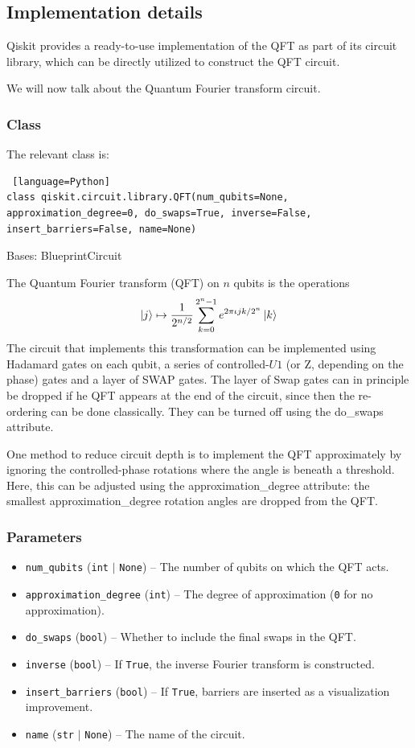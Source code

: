 \subsection{Implementation details}
Qiskit provides a ready-to-use implementation of the QFT as part of its circuit library, which can be directly utilized to construct the QFT circuit. 

We will now talk about the Quantum Fourier transform circuit.
\subsubsection{Class}
The relevant class is:
\begin{lstlisting} [language=Python]
class qiskit.circuit.library.QFT(num_qubits=None, approximation_degree=0, do_swaps=True, inverse=False, insert_barriers=False, name=None) 
\end{lstlisting}
Bases: BlueprintCircuit

The Quantum Fourier transform (QFT) on $n$ qubits is the operations
\[
\ket{j}\mapsto \frac{1}{2^{n/2}}\sum_{k=0}^{2^n-1}e^{2\pi\iota jk/2^n}\ket{k}
\]
The circuit that implements this transformation can be implemented using Hadamard gates on each qubit, a series of controlled-$U1$ (or Z, depending on the phase) gates and a layer of SWAP gates. The layer of Swap gates can in principle be dropped if he QFT appears at the end of the circuit, since then the re-ordering can be done classically. They can be turned off using the do\_swaps attribute.

One method to reduce circuit depth is to implement the QFT approximately by ignoring the controlled-phase rotations where the angle is beneath a threshold. Here, this can be adjusted using the approximation\_degree attribute: the smallest approximation\_degree rotation angles are dropped from the QFT.
\subsubsection{Parameters}
\begin{itemize}
    \item \texttt{num\_qubits} (\texttt{int} $|$ \texttt{None}) – The number of qubits on which the QFT acts.
    \item \texttt{approximation\_degree} (\texttt{int}) – The degree of approximation (\texttt{0} for no approximation).
    \item \texttt{do\_swaps} (\texttt{bool}) – Whether to include the final swaps in the QFT.
    \item \texttt{inverse} (\texttt{bool}) – If \texttt{True}, the inverse Fourier transform is constructed.
    \item \texttt{insert\_barriers} (\texttt{bool}) – If \texttt{True}, barriers are inserted as a visualization improvement.
    \item \texttt{name} (\texttt{str} $|$ \texttt{None}) – The name of the circuit.
\end{itemize}
